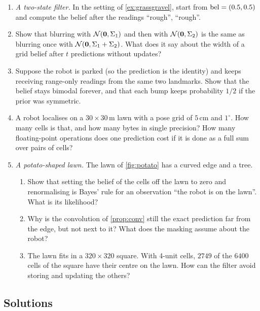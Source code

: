 \begin{enumerate}[label=\textbf{2.\arabic*},ref=2.\arabic*]
\item\label{ex:twostate} \emph{A two-state filter.} In the setting of
  \cref{ex:grassgravel}, start from $\operatorname{bel}=(0.5,0.5)$ and compute the belief
  after the readings ``rough'', ``rough''.
\item\label{ex:blur} Show that blurring with $\mathcal{N}(\bm{0},\Sigma_1)$ and
  then with $\mathcal{N}(\bm{0},\Sigma_2)$ is the same as blurring once with
  $\mathcal{N}(\bm{0},\Sigma_1+\Sigma_2)$. What does it say about the width of
  a grid belief after $t$ predictions without updates?
\item\label{ex:nomotion} Suppose the robot is parked (so the prediction is
  the identity) and keeps receiving range-only readings from the same two
  landmarks. Show that the belief stays bimodal forever, and that each bump
  keeps probability $1/2$ if the prior was symmetric.
\item\label{ex:gridcost} A robot localises on a $30\times30$\,m lawn with a
  pose grid of $5$\,cm and $1^\circ$. How many cells is that, and how many
  bytes in single precision? How many floating-point operations does one
  prediction cost if it is done as a full sum over pairs of cells?
\item\label{ex:potato} \emph{A potato-shaped lawn.} The lawn of
  \cref{fig:potato} has a curved edge and a tree.
  \begin{enumerate}[nosep]
    \item Show that setting the belief of the cells off the lawn to zero
          and renormalising is Bayes' rule for an observation ``the
          robot is on the lawn''. What is its likelihood?
    \item Why is the convolution of \cref{prop:conv} still the exact
          prediction far from the edge, but not next to it? What does the
          masking assume about the robot?
    \item The lawn fits in a $320\times320$ square. With 4-unit cells,
          $2749$ of the $6400$ cells of the square have their centre on
          the lawn. How can the filter avoid storing and updating the
          others?
  \end{enumerate}
\end{enumerate}

\subsection*{Solutions}

